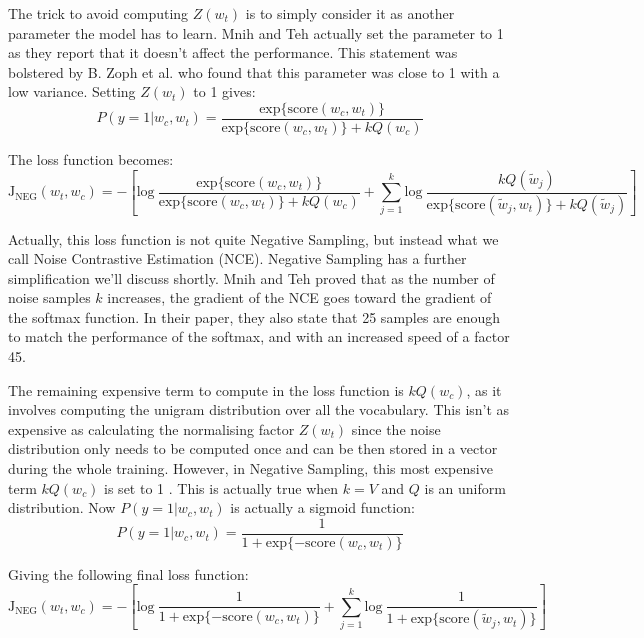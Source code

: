 The trick to avoid computing $Z(w_t)$ is to simply consider it as another parameter the model has to learn. Mnih and Teh \cite{nce} actually set the parameter to 1 as they report that it doesn't affect the performance. This statement was bolstered by B. Zoph et al. \cite{nce2} who found that this parameter was close to 1 with a low variance. Setting $Z(w_t)$ to 1 gives:
\begin{equation}
    P(y=1| w_c, w_t) = \frac{\text{exp}\{\text{score}(w_c, w_t)\}}{\text{exp}\{\text{score}(w_c, w_t)\} + kQ(w_c)}
\end{equation}

The loss function becomes:
\begin{equation}
    \text{J}_{\text{NEG}}(w_t, w_c) = -\left[\text{log}~\frac{\text{exp}\{\text{score}(w_c, w_t)\}}{\text{exp}\{\text{score}(w_c, w_t)\} + kQ(w_c)} + \sum_{j=1}^k\text{log}~\frac{kQ(\tilde{w}_j)}{\text{exp}\{\text{score}(\tilde{w}_j, w_t)\} + kQ(\tilde{w}_j)}\right]
\end{equation}

Actually, this loss function is not quite Negative Sampling, but instead what we call Noise Contrastive Estimation (NCE). Negative Sampling has a further simplification we'll discuss shortly. Mnih and Teh \cite{nce} proved that as the number of noise samples $k$ increases, the gradient of the NCE goes toward the gradient of the softmax function. In their paper, they also state that 25 samples are enough to match the performance of the softmax, and with an increased speed of a factor 45.

\newpage
The remaining expensive term to compute in the loss function is $kQ(w_c)$, as it involves computing the unigram distribution over all the vocabulary. This isn't as expensive as calculating the normalising factor $Z(w_t)$ since the noise distribution only needs to be computed once and can be then stored in a vector during the whole training. However, in Negative Sampling, this most expensive term $kQ(w_c)$ is set to 1 \cite{word2vec2}. This is actually true when $k=V$ and $Q$ is an uniform distribution.	 Now $P(y=1| w_c, w_t)$ is actually a sigmoid function:
\begin{equation}
    P(y=1| w_c, w_t) = \frac{1}{1 + \text{exp}\{-\text{score}(w_c, w_t)\}}
\end{equation}

Giving the following final loss function:
\begin{equation}
    \text{J}_{\text{NEG}}(w_t, w_c) = -\left[\text{log}~\frac{1}{1 + \text{exp}\{-\text{score}(w_c, w_t)\}} + \sum_{j=1}^k\text{log}~\frac{1}{1 + \text{exp}\{\text{score}(\tilde{w}_j, w_t)\}}\right]
\end{equation}

